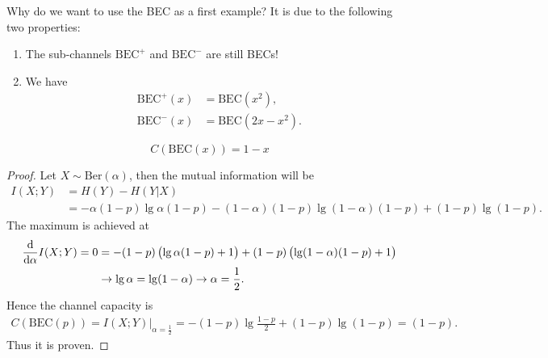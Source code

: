 Why do we want to use the BEC as a first example? It is due to the following two properties:
\begin{lemma}
    \begin{enumerate}
        \item The sub-channels $\mathrm{BEC}^{+}$ and $\mathrm{BEC}^{-}$ are still BECs!
        \item We have 
        \begin{align}
            \mathrm{BEC}^{+}(x) &= \mathrm{BEC}(x^2), \label{eq:w1_bec+}\\
            \mathrm{BEC}^{-}(x) &= \mathrm{BEC}(2x-x^2). \label{eq:w1_bec-}
        \end{align}
    \end{enumerate}
\end{lemma}

\begin{lemma}
    \begin{equation}
        C\left(\mathrm{BEC}(x)\right) = 1-x
    \end{equation}
\end{lemma}

\begin{proof}
    Let $X\sim \mathrm{Ber}(\alpha)$, then the mutual information will be
    \begin{align*}
        I(X;Y) &= H(Y) - H(Y|X) \\
        &= -\alpha(1-p) \lg\alpha(1-p) - (1-\alpha)(1-p) \lg(1-\alpha)(1-p) + (1-p)\lg(1-p).
    \end{align*}
    The maximum is achieved at
    \begin{align*}
        \frac{\mathrm{d}{}}{\mathrm{d}{\alpha}} I(X;Y) = 0 &= -(1-p)\left(\lg\alpha(1-p) + 1\right) + (1-p)\left(\lg(1-\alpha)(1-p) + 1\right) \\
        &\rightarrow \lg\alpha = \lg(1-\alpha) \rightarrow \alpha = \frac{1}{2}.
    \end{align*}
    Hence the channel capacity is
    \begin{align*}
        C\left(\mathrm{BEC}(p)\right) = \left.I(X;Y)\right|_{\alpha=\frac{1}{2}} = -(1-p)\lg\frac{1-p}{2} + (1-p) \lg (1-p) = (1-p).
    \end{align*}
    Thus it is proven.
\end{proof}

